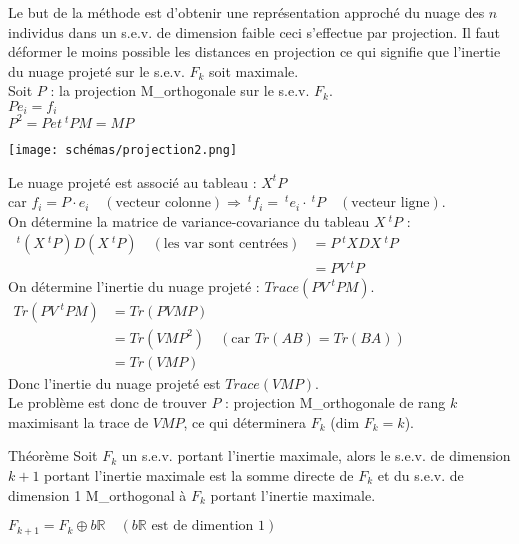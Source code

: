\documentclass[a4paper, 12pt]{article}
\begin{document}
Le but de la méthode est d'obtenir une représentation approché du nuage des $n$ individus dans un s.e.v. de dimension faible ceci s'effectue par projection. Il faut déformer le moins possible les distances en projection ce qui signifie que l'inertie du nuage projeté sur le s.e.v. $F_k$ soit maximale. \\

Soit $P$ : la projection M\_{}orthogonale sur le s.e.v. $F_k$. \\
$Pe_i = f_i$ \\
$P^2 = P et \ ^t PM = MP$ \\

\begin{center}
\texttt{[image: schémas/projection2.png]}
\end{center}

Le nuage projeté est associé au tableau : $X^t P$ \\
car $f_i = P \cdot e_i \quad (\text{vecteur colonne}) \Rightarrow \ ^t f_i = \ ^t e_i \cdot \ ^t P \quad (\text{vecteur ligne})$. \\
On détermine la matrice de variance-covariance du tableau $X \ ^t P$ : \\
$
\begin{aligned}
\ ^t (X \ ^t P) D (X \ ^t P) \quad (\text{les var sont centrées}) &= P \ ^t XDX \ ^t P \\
&= \boxed{P V \ ^t P}
\end{aligned}
$ \\

On détermine l'inertie du nuage projeté : $Trace (PV \ ^t PM)$. \\

$
\begin{aligned}
Tr(PV \ ^t PM) &= Tr(PVMP) \\
&= Tr(VMP^2) \quad (\text{car } Tr(AB) = Tr(BA)) \\
&= Tr(VMP)
\end{aligned}
$ \\

Donc l'inertie du nuage projeté est $Trace(VMP)$. \\
Le problème est donc de trouver $P$ : projection M\_{}orthogonale de rang $k$ maximisant la trace de $VMP$, ce qui déterminera $F_k$ (dim $F_k = k$).

\begin{theoreme}{Théorème}
Soit $F_k$ un s.e.v. portant l'inertie maximale, alors le s.e.v. de dimension $k + 1$ portant l'inertie maximale est la somme directe de $F_k$ et du s.e.v. de dimension 1 M\_{}orthogonal à $F_k$ portant l'inertie maximale. \\
\begin{center}
$\boxed{F_{k + 1} = F_k \oplus b \mathbb{R}} \quad (b\mathbb{R} \text{ est de dimention 1})$
\end{center}
\end{theoreme}
\end{document}
